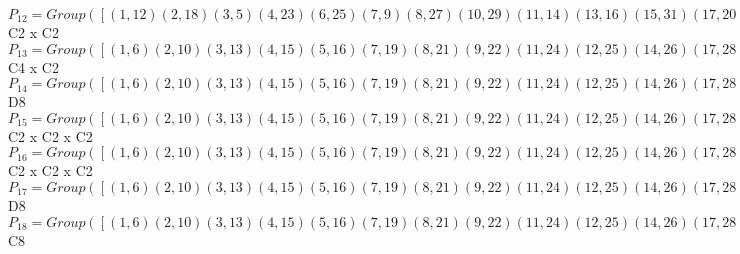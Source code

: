 \documentclass[varwidth=\maxdimen,border=10]{standalone}
\begin{document}
\begin{tabular}
$P_{12} = Group( [ ( 1,12)( 2,18)( 3, 5)( 4,23)( 6,25)( 7, 9)( 8,27)(10,29)(11,14)(13,16)(15,31)(17,20)(19,22)(21,32)(24,26)(28,30), ( 1, 4)( 2, 8)( 3,11)( 5,14)( 6,15)( 7,17)( 9,20)(10,21)(12,23)(13,24)(16,26)(18,27)(19,28)(22,30)(25,31)(29,32) ] )\cong$ C2 x C2\ \\
$P_{13} = Group( [ ( 1, 6)( 2,10)( 3,13)( 4,15)( 5,16)( 7,19)( 8,21)( 9,22)(11,24)(12,25)(14,26)(17,28)(18,29)(20,30)(23,31)(27,32), ( 1, 4)( 2, 8)( 3,11)( 5,14)( 6,15)( 7,17)( 9,20)(10,21)(12,23)(13,24)(16,26)(18,27)(19,28)(22,30)(25,31)(29,32), ( 1, 5, 6,16)( 2, 9,10,22)( 3,12,13,25)( 4,14,15,26)( 7,18,19,29)( 8,20,21,30)(11,23,24,31)(17,27,28,32) ] )\cong$ C4 x C2\ \\
$P_{14} = Group( [ ( 1, 6)( 2,10)( 3,13)( 4,15)( 5,16)( 7,19)( 8,21)( 9,22)(11,24)(12,25)(14,26)(17,28)(18,29)(20,30)(23,31)(27,32), ( 1, 3)( 2, 7)( 4,11)( 5,25)( 6,13)( 8,17)( 9,29)(10,19)(12,16)(14,31)(15,24)(18,22)(20,32)(21,28)(23,26)(27,30), ( 1, 5, 6,16)( 2, 9,10,22)( 3,12,13,25)( 4,14,15,26)( 7,18,19,29)( 8,20,21,30)(11,23,24,31)(17,27,28,32) ] )\cong$ D8\ \\
$P_{15} = Group( [ ( 1, 6)( 2,10)( 3,13)( 4,15)( 5,16)( 7,19)( 8,21)( 9,22)(11,24)(12,25)(14,26)(17,28)(18,29)(20,30)(23,31)(27,32), ( 1, 3)( 2, 7)( 4,11)( 5,25)( 6,13)( 8,17)( 9,29)(10,19)(12,16)(14,31)(15,24)(18,22)(20,32)(21,28)(23,26)(27,30), ( 1, 4)( 2, 8)( 3,11)( 5,14)( 6,15)( 7,17)( 9,20)(10,21)(12,23)(13,24)(16,26)(18,27)(19,28)(22,30)(25,31)(29,32) ] )\cong$ C2 x C2 x C2\ \\
$P_{16} = Group( [ ( 1, 6)( 2,10)( 3,13)( 4,15)( 5,16)( 7,19)( 8,21)( 9,22)(11,24)(12,25)(14,26)(17,28)(18,29)(20,30)(23,31)(27,32), ( 1,12)( 2,18)( 3, 5)( 4,23)( 6,25)( 7, 9)( 8,27)(10,29)(11,14)(13,16)(15,31)(17,20)(19,22)(21,32)(24,26)(28,30), ( 1, 4)( 2, 8)( 3,11)( 5,14)( 6,15)( 7,17)( 9,20)(10,21)(12,23)(13,24)(16,26)(18,27)(19,28)(22,30)(25,31)(29,32) ] )\cong$ C2 x C2 x C2\ \\
$P_{17} = Group( [ ( 1, 6)( 2,10)( 3,13)( 4,15)( 5,16)( 7,19)( 8,21)( 9,22)(11,24)(12,25)(14,26)(17,28)(18,29)(20,30)(23,31)(27,32), ( 1, 3)( 2, 7)( 4,11)( 5,25)( 6,13)( 8,17)( 9,29)(10,19)(12,16)(14,31)(15,24)(18,22)(20,32)(21,28)(23,26)(27,30), ( 1,14, 6,26)( 2,20,10,30)( 3,23,13,31)( 4, 5,15,16)( 7,27,19,32)( 8, 9,21,22)(11,12,24,25)(17,18,28,29) ] )\cong$ D8\ \\
$P_{18} = Group( [ ( 1, 6)( 2,10)( 3,13)( 4,15)( 5,16)( 7,19)( 8,21)( 9,22)(11,24)(12,25)(14,26)(17,28)(18,29)(20,30)(23,31)(27,32), ( 1, 2, 5, 9, 6,10,16,22)( 3,17,12,27,13,28,25,32)( 4,21,14,30,15, 8,26,20)( 7,31,18,11,19,23,29,24), ( 1, 5, 6,16)( 2, 9,10,22)( 3,12,13,25)( 4,14,15,26)( 7,18,19,29)( 8,20,21,30)(11,23,24,31)(17,27,28,32) ] )\cong$ C8\ \\

\end{tabular}
\end{document}
